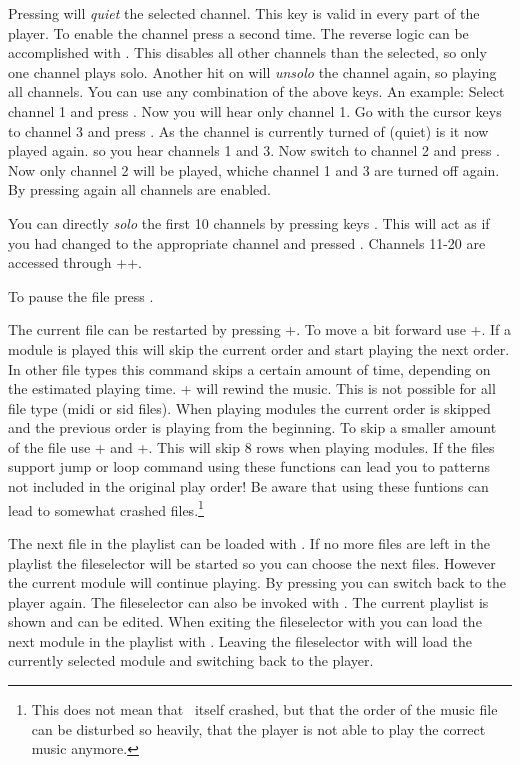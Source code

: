 Pressing  will \emph{quiet} the selected channel. This key is valid in
every part of the player. To enable the channel press  a second time.
The reverse logic can be accomplished with . This disables all other
channels than the selected, so only one channel plays solo. Another hit on
 will \emph{unsolo} the channel again, so playing all channels. You
can use any combination of the above keys. An example: Select channel 1 and
press . Now you will hear only channel 1. Go with the cursor keys
to channel 3 and press . As the channel is currently turned of (quiet)
is it now played again. so you hear channels 1 and 3. Now switch to channel 2
and press . Now only channel 2 will be played, whiche channel 1 and 3
are turned off again. By pressing  again all channels are enabled.

You can directly \emph{solo} the first 10 channels by pressing keys \dojdots{}.
This will act as if you had changed to the appropriate channel and pressed
. Channels 11-20 are accessed through +\dojdots{}+.

To pause the file press .

The current file can be restarted by pressing +. To
move a bit forward use +\keys{$\rightarrow$}. If a module is played this
will skip the current order and start playing the next order. In other file
types this command skips a certain amount of time, depending on the estimated
playing time. +\keys{$\leftarrow$} will rewind the music. This is
not possible for all file type (midi or sid files). When playing modules the
current order is skipped and the previous order is playing from the beginning.
To skip a smaller amount of the file use +\keys{$\uparrow$} and
+\keys{$\downarrow$}. This will skip 8 rows when playing modules.
If the files support jump or loop command using these functions can lead you
to patterns not included in the original play order! Be aware that using these
funtions can lead to somewhat crashed files.\footnote{This does not mean that
\cp\ itself crashed, but that the order of the music file can be disturbed so
heavily, that the player is not able to play the correct music anymore.}

The next file in the playlist can be loaded with . If no more files
are left in the playlist the fileselector will be started so you can choose
the next files. However the current module will continue playing. By pressing
 you can switch back to the player again. The fileselector can also
be invoked with . The current playlist is shown and can be edited. When
exiting the fileselector with  you can load the next module in the
playlist with . Leaving the fileselector with  will
load the currently selected module and switching back to the player.

